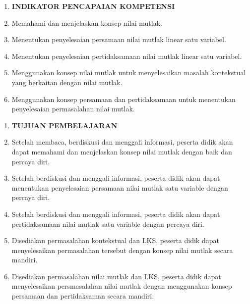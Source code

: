 \documentclass[11pt,fleqn]{book} %
\begin{document}
\begin{enumerate}
\item  \textbf{INDIKATOR PENCAPAIAN KOMPETENSI}

\item \textbf{ }Memahami dan menjelaskan konsep nilai mutlak.

\item  Menentukan penyelesaian persamaan nilai mutlak linear satu variabel.

\item  Menentukan penyelesaian pertidaksamaan nilai mutlak linear satu variabel.

\item  Menggunakan konsep nilai mutlak untuk menyelesaikan masalah kontekstual yang berkaitan dengan nilai mutlak.

\item  Menggunakan konsep persamaan dan pertidaksamaan untuk menentukan penyelesaian permasalahan nilai mutlak.
\end{enumerate}

\noindent \textbf{}

\begin{enumerate}
\item \textbf{ TUJUAN PEMBELAJARAN }

\item \textbf{ }Setelah membaca, berdiskusi dan menggali informasi, peserta didik akan dapat memahami dan menjelaskan konsep nilai mutlak dengan baik dan percaya diri.

\item  Setelah berdiskusi dan menggali informasi, peserta didik akan dapat menentukan penyelesaian persamaan nilai mutlak satu variable dengan percaya diri.

\item  Setelah berdiskusi dan menggali informasi, peserta didik akan dapat pertidaksamaan nilai mutlak satu variable dengan percaya diri.

\item  Disediakan permasalahan kontekstual dan LKS, peserta didik dapat menyelesaikan permasalahan tersebut dengan konsep nilai mutlak secara mandiri.

\item  Disediakan permasalahan nilai mutlak dan LKS, peserta didik dapat menyelesaikan persmasalahan nilai mutlak dengan menggunakan konsep persamaan dan pertidaksaman secara mandiri.
\end{enumerate}

\noindent 
\end{document}
